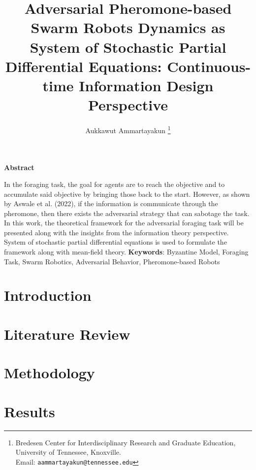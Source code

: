 \documentclass[12pt]{article}
\begin{document}
\title{Adversarial Pheromone-based Swarm Robots Dynamics as System of Stochastic Partial Differential Equations: Continuous-time Information Design Perspective}  

\author{
Aukkawut Ammartayakun   \thanks{Bredesen Center for Interdisciplinary Research and Graduate Education, University of Tennessee, Knoxville.  \\Email: {\tt aammartayakun@tennessee.edu}}  
}

\maketitle

\begin{center}
\textbf{Abstract}
\end{center}

In the foraging task, the goal for agents are to reach the objective and to accumulate said objective by bringing those back to the start. However, as shown by Aswale et al. (2022), if the information is communicate through the pheromone, then there exists the adversarial strategy that can sabotage the task. In this work, the theoretical framework for the adversarial foraging task will be presented along with the insights from the information theory perspective. System of stochastic partial differential equations is used to formulate the framework along with mean-field theory. 
\noindent
\textbf{Keywords}: Byzantine Model, Foraging Task, Swarm Robotics, Adversarial Behavior, Pheromone-based Robots

\thispagestyle{empty}

\newpage


\section{Introduction}\label{intro}

\section{Literature Review}
\section{Methodology}
\section{Results}
\end{document}
